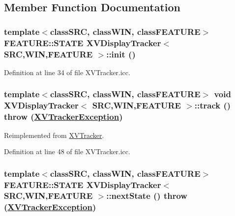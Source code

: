 \subsection{Member Function Documentation}
\label{XVDisplayTracker_a1}
\hypertarget{class_XVDisplayTracker_a1}{
\subsubsection[init]{\setlength{\rightskip}{0pt plus 5cm}template$<$classSRC, classWIN, classFEATURE$>$ FEATURE::STATE XVDisplay\-Tracker$<$ SRC,WIN,FEATURE $>$::init ()}}




Definition at line 34 of file XVTracker.icc.\label{XVDisplayTracker_a2}
\hypertarget{class_XVDisplayTracker_a2}{
\subsubsection[track]{\setlength{\rightskip}{0pt plus 5cm}template$<$classSRC, classWIN, classFEATURE$>$ void XVDisplay\-Tracker$<$ SRC,WIN,FEATURE $>$::track ()  throw (\hyperlink{class_XVTrackerException}{XVTracker\-Exception})}}




Reimplemented from \hyperlink{class_XVTracker}{XVTracker}.

Definition at line 48 of file XVTracker.icc.\label{XVDisplayTracker_a3}
\hypertarget{class_XVDisplayTracker_a3}{
\subsubsection[nextState]{\setlength{\rightskip}{0pt plus 5cm}template$<$classSRC, classWIN, classFEATURE$>$ FEATURE::STATE XVDisplay\-Tracker$<$ SRC,WIN,FEATURE $>$::next\-State ()  throw (\hyperlink{class_XVTrackerException}{XVTracker\-Exception})}}




